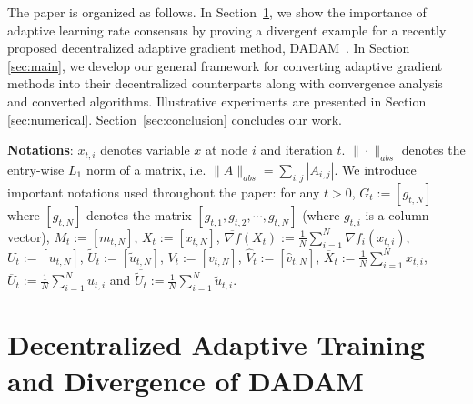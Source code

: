 \documentclass[11pt]{article}
\begin{document}
The paper is organized as follows. In Section~\ref{sec:prelim}, we show the importance of adaptive learning rate consensus by proving a divergent example for a recently proposed decentralized adaptive gradient method, DADAM~\citep{nazari2019dadam}. In Section \ref{sec:main}, we develop our general framework for converting adaptive gradient methods into their decentralized counterparts along with convergence analysis and converted algorithms. Illustrative experiments are presented in Section \ref{sec:numerical}. 
Section~\ref{sec:conclusion} concludes our work.

 \textbf{Notations}: $x_{t,i}$ denotes variable $x$ at node $i$ and iteration $t$. $\|\cdot \|_{abs}$ denotes the entry-wise $L_1$ norm of a matrix, i.e. $\|A\|_{abs}= \sum_{i,j} |A_{i,j}|$. 
We introduce important notations used throughout the paper: for any $t>0$, $G_t := [g_{t,N}]$ where $[g_{t,N}]$ denotes the matrix $[g_{t,1}, g_{t,2}, \cdots, g_{t,N}]$ (where $g_{t,i}$ is a column vector), $M_t := [m_{t,N}]$, $X_t := [x_{t,N}]$, $\overline {\nabla f}(X_t) := \frac{1}{N}\sum_{i=1}^N \nabla f_i(x_{t,i})$, $U_t := [u_{t,N}]$, $ \tilde U_t := [\tilde u_{t,N}]$, $ V_t := [ v_{t,N}]$, $\hat V_t := [\hat v_{t,N}]$, $\overline X_t := \frac{1}{N}\sum_{i=1}^N x_{t,i} $, $\overline U_t := \frac{1}{N}\sum_{i=1}^N u_{t,i} $ and $\overline {\tilde U_t} := \frac{1}{N}\sum_{i=1}^N  \tilde u_{t,i} $. 


 

\section{Decentralized Adaptive Training and Divergence of DADAM}\label{sec:prelim}
\end{document}
